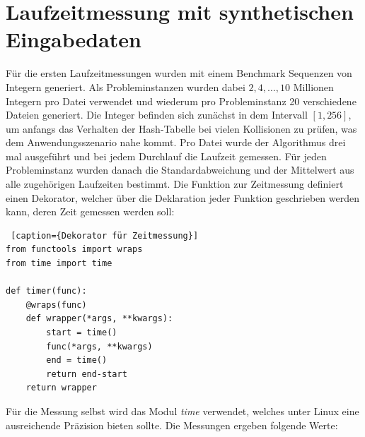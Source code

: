 \section{Laufzeitmessung mit synthetischen Eingabedaten}
Für die ersten Laufzeitmessungen wurden mit einem Benchmark Sequenzen von Integern generiert. Als Probleminstanzen wurden dabei \(2, 4, \dots{}, 10\) Millionen Integern pro Datei verwendet und wiederum pro Probleminstanz 20 verschiedene Dateien generiert. Die Integer befinden sich zunächst in dem Intervall \([1, 256]\), um anfangs das Verhalten der Hash-Tabelle bei vielen Kollisionen zu prüfen, was dem Anwendungsszenario nahe kommt. Pro Datei wurde der Algorithmus drei mal ausgeführt und bei jedem Durchlauf die Laufzeit gemessen. Für jeden Probleminstanz wurden danach die Standardabweichung und der Mittelwert aus alle zugehörigen Laufzeiten bestimmt.
\newpage
Die Funktion zur Zeitmessung definiert einen Dekorator, welcher über die Deklaration jeder Funktion geschrieben werden kann, deren Zeit gemessen werden soll:
\begin{lstlisting} [caption={Dekorator für Zeitmessung}]
from functools import wraps
from time import time

def timer(func):
    @wraps(func)
    def wrapper(*args, **kwargs):
        start = time()
        func(*args, **kwargs)
        end = time()
        return end-start
    return wrapper
\end{lstlisting}
Für die Messung selbst wird das Modul \textit{time} verwendet, welches unter Linux eine ausreichende Präzision bieten sollte.
Die Messungen ergeben folgende Werte:
\newpage
